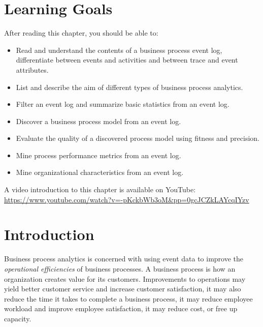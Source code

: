 %
%
\section*{Learning Goals}

After reading this chapter, you should be able to:
\begin{itemize}
   \item Read and understand the contents of a business process event log, differentiate between events and activities and between trace and event attributes.
   \item List and describe the aim of different types of business process analytics.
   \item Filter an event log and summarize basic statistics from an event log.
   \item Discover a business process model from an event log.
   \item Evaluate the quality of a discovered process model using fitness and precision.
   \item Mine process performance metrics from an event log.
   \item Mine organizational characteristics from an event log.   
\end{itemize}

\begin{advanced}
\begin{videobox}
A video introduction to this chapter is available on YouTube:\\

\url{https://www.youtube.com/watch?v=-pKckbWb3oM&pp=0gcJCZkLAYcqIYzv}
\end{videobox}
\end{advanced}


\section{Introduction}

Business process analytics is concerned with using event data to improve the \emph{operational efficiencies} of business processes. A business process is how an organization creates value for its customers. Improvements to operations may yield better customer service and increase customer satisfaction, it may also reduce the time it takes to complete a business process, it may reduce employee workload and improve employee satisfaction, it may reduce cost, or free up capacity. 

